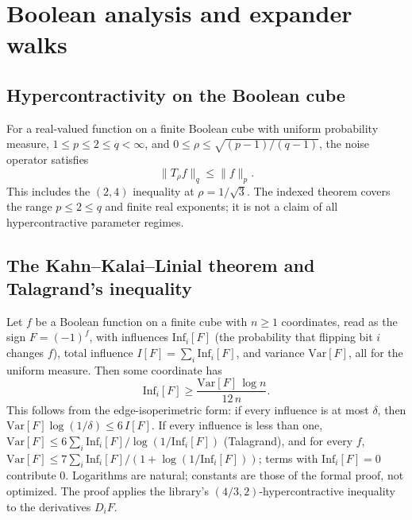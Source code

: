 \section{Boolean analysis and expander walks}

\begin{result}
\subsection{Hypercontractivity on the Boolean cube}
For a real-valued function on a finite Boolean cube with uniform probability
measure, $1\le p\le2\le q<\infty$, and
$0\le\rho\le\sqrt{(p-1)/(q-1)}$, the noise operator satisfies
\[
\|T_\rho f\|_q\le\|f\|_p.
\]
This includes the $(2,4)$ inequality at $\rho=1/\sqrt3$. The indexed theorem
covers the range $p\le2\le q$ and finite real exponents; it is not a claim of all
hypercontractive parameter regimes.\citep{Bonami1970,ODonnell2014}
\end{result}

\begin{result}
\subsection{The Kahn--Kalai--Linial theorem and Talagrand's inequality}
Let $f$ be a Boolean function on a finite cube with $n\ge1$ coordinates, read as
the sign $F=(-1)^{f}$, with influences $\mathrm{Inf}_i[F]$ (the probability that
flipping bit $i$ changes $f$), total influence $I[F]=\sum_i\mathrm{Inf}_i[F]$, and
variance $\mathrm{Var}[F]$, all for the uniform measure. Then some coordinate has
\[
\mathrm{Inf}_i[F]\ge\frac{\mathrm{Var}[F]\,\log n}{12\,n}.
\]
This follows from the edge-isoperimetric form: if every influence is at most
$\delta$, then $\mathrm{Var}[F]\log(1/\delta)\le 6\,I[F]$. If every influence is
less than one, $\mathrm{Var}[F]\le6\sum_i\mathrm{Inf}_i[F]/\log(1/\mathrm{Inf}_i[F])$
(Talagrand), and for every $f$,
$\mathrm{Var}[F]\le7\sum_i\mathrm{Inf}_i[F]/(1+\log(1/\mathrm{Inf}_i[F]))$; terms with
$\mathrm{Inf}_i[F]=0$ contribute $0$. Logarithms are natural; constants are those of the
formal proof, not optimized. The proof applies the library's $(4/3,2)$-hypercontractive
inequality to the derivatives $D_iF$.\citep{KahnKalaiLinial1988,Talagrand1994,ODonnell2014}
\end{result}


